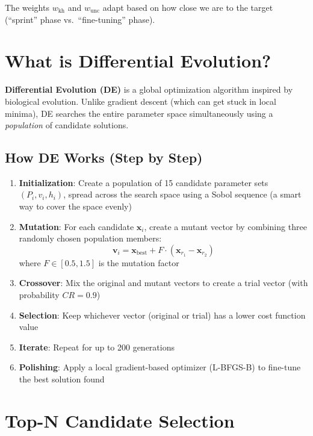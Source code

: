 \documentclass[12pt,a4paper]{report}
\begin{document}
The weights $w_{\text{kh}}$ and $w_{\text{unc}}$ adapt based on how close we are to the target (``sprint'' phase vs.\ ``fine-tuning'' phase).

\section{What is Differential Evolution?}

\textbf{Differential Evolution (DE)} is a global optimization algorithm inspired by biological evolution. Unlike gradient descent (which can get stuck in local minima), DE searches the entire parameter space simultaneously using a \textit{population} of candidate solutions.

\subsection{How DE Works (Step by Step)}

\begin{enumerate}
  \item \textbf{Initialization}: Create a population of 15 candidate parameter sets $(P_i, v_i, h_i)$, spread across the search space using a Sobol sequence (a smart way to cover the space evenly)
  
  \item \textbf{Mutation}: For each candidate $\mathbf{x}_i$, create a mutant vector by combining three randomly chosen population members:
  \begin{equation}
    \mathbf{v}_i = \mathbf{x}_{\text{best}} + F \cdot (\mathbf{x}_{r_1} - \mathbf{x}_{r_2})
  \end{equation}
  where $F \in [0.5, 1.5]$ is the mutation factor
  
  \item \textbf{Crossover}: Mix the original and mutant vectors to create a trial vector (with probability $CR = 0.9$)
  
  \item \textbf{Selection}: Keep whichever vector (original or trial) has a lower cost function value
  
  \item \textbf{Iterate}: Repeat for up to 200 generations
  
  \item \textbf{Polishing}: Apply a local gradient-based optimizer (L-BFGS-B) to fine-tune the best solution found
\end{enumerate}

\section{Top-N Candidate Selection}
\end{document}

